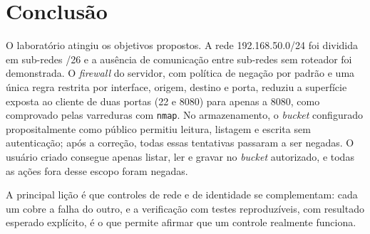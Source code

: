 \chapter{Conclusão}

O laboratório atingiu os objetivos propostos. A rede 192.168.50.0/24 foi dividida em
sub-redes /26 e a ausência de comunicação entre sub-redes sem roteador foi demonstrada.
O \textit{firewall} do servidor, com política de negação por padrão e uma única regra
restrita por interface, origem, destino e porta, reduziu a superfície exposta ao cliente
de duas portas (22 e 8080) para apenas a 8080, como comprovado pelas varreduras com
\texttt{nmap}. No armazenamento, o \textit{bucket} configurado propositalmente como público
permitiu leitura, listagem e escrita sem autenticação; após a correção, todas essas
tentativas passaram a ser negadas. O usuário criado consegue apenas listar, ler e gravar
no \textit{bucket} autorizado, e todas as ações fora desse escopo foram negadas.

A principal lição é que controles de rede e de identidade se complementam: cada um cobre
a falha do outro, e a verificação com testes reproduzíveis, com resultado esperado
explícito, é o que permite afirmar que um controle realmente funciona.

